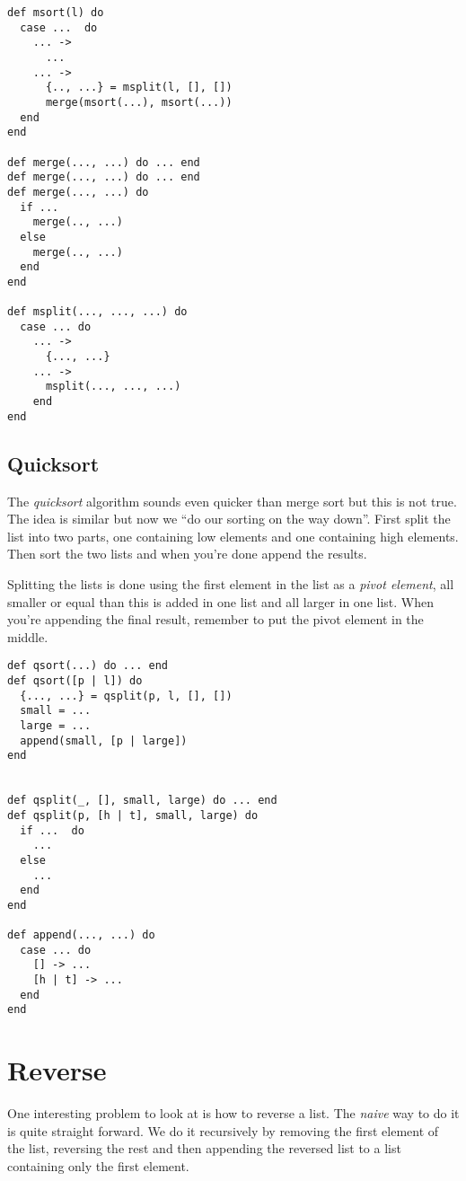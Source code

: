 \documentclass[a4paper,11pt]{article}
\begin{document}
\begin{verbatim}
def msort(l) do
  case ...  do
    ... -> 
      ...
    ... ->
      {.., ...} = msplit(l, [], [])
      merge(msort(...), msort(...))
  end
end

def merge(..., ...) do ... end
def merge(..., ...) do ... end
def merge(..., ...) do
  if ...
    merge(.., ...)
  else 
    merge(.., ...)
  end
end

def msplit(..., ..., ...) do
  case ... do
    ... -> 
      {..., ...}
    ... ->
      msplit(..., ..., ...)
    end
end
\end{verbatim}


\subsection{Quicksort}

The {\em quicksort} algorithm sounds even quicker than merge sort but
this is not true. The idea is similar but now we ``do our sorting on
the way down''. First split the list into two parts, one containing low
elements and one containing high elements. Then sort the two lists and
when you're done append the results. 

Splitting the lists is done using the first element in the list as a
{\em pivot element}, all smaller or equal than this is added in one
list and all larger in one list. When you're appending the final
result, remember to put the pivot element in the middle.

\begin{verbatim}
def qsort(...) do ... end
def qsort([p | l]) do 
  {..., ...} = qsplit(p, l, [], [])
  small = ...
  large = ...
  append(small, [p | large])
end


def qsplit(_, [], small, large) do ... end
def qsplit(p, [h | t], small, large) do
  if ...  do
    ...
  else
    ...
  end
end

def append(..., ...) do
  case ... do
    [] -> ...
    [h | t] -> ...
  end
end
\end{verbatim}



\section{Reverse}

One interesting problem to look at is how to reverse a list. The {\em
  naive} way to do it is quite straight forward. We do it recursively
by removing the first element of the list, reversing the rest and then
appending the reversed list to a list containing only the first element.
\end{document}
